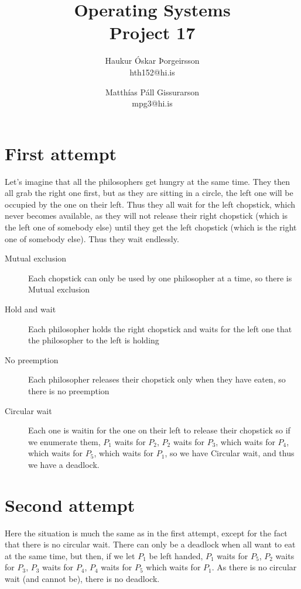 \documentclass[a4]{article}
\title{Operating Systems\\
Project 17}
\author{
    Haukur Óskar Þorgeirsson\\
    hth152@hi.is \and
    Matthías Páll Gissurarson\\
    mpg3@hi.is
}
\begin{document}
\maketitle

\section{First attempt}
Let's imagine that all the philosophers get hungry at the same
time. They then all grab the right one first, but as they are sitting
in a circle, the left one will be occupied by the one on their
left. Thus they all wait for the left chopstick, which never becomes
available, as they will not release their right chopstick (which is
the left one of somebody else) until they get the left chopstick
(which is the right one of somebody else). Thus they wait endlessly.
\begin{description}
\item[Mutual exclusion] Each chopstick can only be used by one
  philosopher at a time, so there is Mutual exclusion
\item[Hold and wait] Each philosopher holds the right chopstick and
  waits for the left one that the philosopher to the left is holding
\item[No preemption] Each philosopher releases their chopstick only
  when they have eaten, so there is no preemption
\item[Circular wait] Each one is waitin for the one on their left to
  release their chopstick so if we enumerate them, $P_1$ waits for
  $P_2$, $P_2$ waits for $P_3$, which waits for $P_4$, which waits for
  $P_5$, which waits for $P_1$, so we have Circular wait, and thus we
  have a deadlock.
\end{description}

\section{Second attempt}
Here the situation is much the same as in the first attempt, except
for the fact that there is no circular wait. There can only be a
deadlock when all want to eat at the same time, but then, if we let
$P_1$ be left handed, $P_1$ waits for $P_5$, $P_2$ waits for $P_3$,
$P_3$ waits for $P_4$, $P_4$ waits for $P_5$ which waits for $P_1$. As
there is no circular wait (and cannot be), there is no deadlock.
\end{document}
